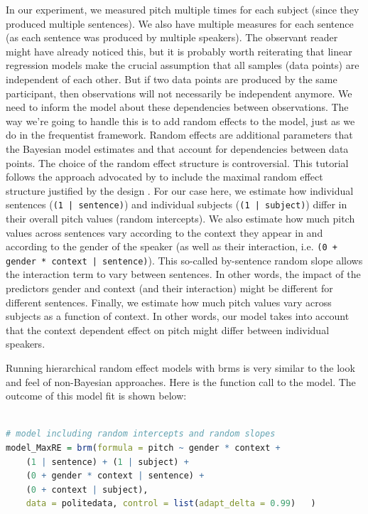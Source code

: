 \documentclass[nobib]{tufte-handout}
\begin{document}
In our experiment, we measured pitch multiple times for each subject (since they produced
multiple sentences). We also have multiple measures for each sentence (as each sentence was
produced by multiple speakers). The observant reader might have already noticed this, but it is
probably worth reiterating that linear regression models make the crucial assumption that all
samples (data points) are independent of each other. But if two data points are produced by the
same participant, then observations will not necessarily be independent anymore. We need to
inform the model about these dependencies between observations. The way we’re going to handle
this is to add random effects to the model, just as we do in the frequentist framework. Random
effects are additional parameters that the Bayesian model estimates and that account for
dependencies between data points. The choice of the random effect structure is controversial.
This tutorial follows the approach advocated by \citet{barr2013random} to include the maximal
random effect structure justified by the design \citep[for a complementary view on random
effect specifications, see][]{matuschek2017balancing}. For our case here, we estimate how
individual sentences (\texttt{(1 | sentence)}) and individual subjects (\texttt{(1 | subject)})
differ in their overall pitch values (random intercepts). We also estimate how much pitch
values across sentences vary according to the context they appear in and according to the
gender of the speaker (as well as their interaction, i.e. \texttt{(0 + gender * context |
  sentence)}). This so-called by-sentence random slope allows the interaction term to vary
between sentences. In other words, the impact of the predictors gender and context (and their
interaction) might be different for different sentences. Finally, we estimate how much pitch
values vary across subjects as a function of context. In other words, our model takes into
account that the context dependent effect on pitch might differ between individual speakers.

Running hierarchical random effect models with \textrm{brms} is very similar to the look and feel of non-Bayesian approaches. Here is the function call to the model.
The outcome of this model fit is shown below:

\begin{minipage}[]{1\textwidth}
\begin{lstlisting}[language=R]

# model including random intercepts and random slopes 
model_MaxRE = brm(formula = pitch ~ gender * context +
	(1 | sentence) + (1 | subject) + 
	(0 + gender * context | sentence) +
	(0 + context | subject),
	data = politedata, control = list(adapt_delta = 0.99)	)
\end{lstlisting}
\end{minipage}
\end{document}
